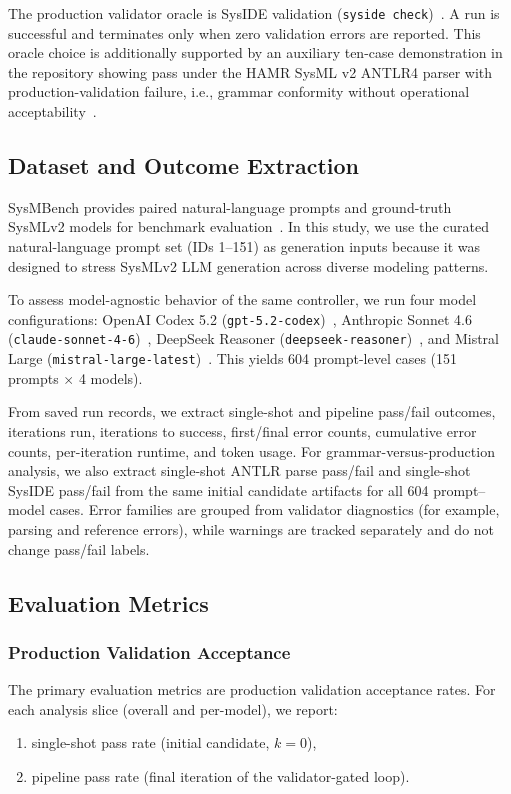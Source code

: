 The production validator oracle is SysIDE validation (\texttt{syside check})~\cite{sensmetry2024syside}. A run is successful and terminates only when zero validation errors are reported.
This oracle choice is additionally supported by an auxiliary ten-case demonstration in the repository showing pass under the HAMR SysML v2 ANTLR4 parser with production-validation failure, i.e., grammar conformity without operational acceptability~\cite{antlrVsSysideDemo2026,hamrSysmlParser2026,sysmlV2PilotImplementation2026}.

\subsection{Dataset and Outcome Extraction}
SysMBench provides paired natural-language prompts and ground-truth SysMLv2 models for benchmark evaluation~\cite{jin2025sysmbench}. In this study, we use the curated natural-language prompt set (IDs 1--151) as generation inputs because it was designed to stress SysMLv2 LLM generation across diverse modeling patterns.

To assess model-agnostic behavior of the same controller, we run four model configurations: OpenAI Codex 5.2 (\texttt{gpt-5.2-codex})~\cite{openaiGPT52Codex2026}, Anthropic Sonnet 4.6 (\texttt{claude-sonnet-4-6})~\cite{anthropicSonnet46API2026}, DeepSeek Reasoner (\texttt{deepseek-reasoner})~\cite{deepseekReasonerAPI2026}, and Mistral Large (\texttt{mistral-large-latest})~\cite{mistralLargeLatestDocs2026}. This yields 604 prompt-level cases (151 prompts $\times$ 4 models).

From saved run records, we extract single-shot and pipeline pass/fail outcomes, iterations run, iterations to success, first/final error counts, cumulative error counts, per-iteration runtime, and token usage. For grammar-versus-production analysis, we also extract single-shot ANTLR parse pass/fail and single-shot SysIDE pass/fail from the same initial candidate artifacts for all 604 prompt--model cases. Error families are grouped from validator diagnostics (for example, parsing and reference errors), while warnings are tracked separately and do not change pass/fail labels.

\subsection{Evaluation Metrics}
\subsubsection{Production Validation Acceptance}
The primary evaluation metrics are production validation acceptance rates. For each analysis slice (overall and per-model), we report:
\begin{enumerate}
    \item single-shot pass rate (initial candidate, $k=0$),
    \item pipeline pass rate (final iteration of the validator-gated loop).
\end{enumerate}


